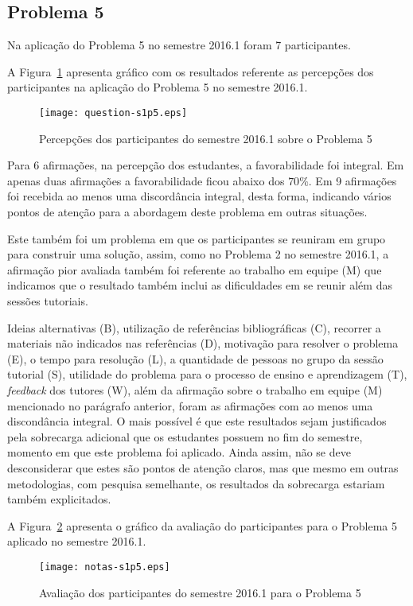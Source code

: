 \subsection{Problema 5}
Na aplicação do Problema 5 no semestre 2016.1 foram 7 participantes.

A Figura~\ref{percep-s1p5} apresenta gráfico com os resultados referente
as percepções dos participantes na aplicação do
Problema 5 no semestre 2016.1.
\begin{figure}[!htb]
\centering
\texttt{[image: question-s1p5.eps]}
\caption{Percepções dos participantes do semestre 2016.1 sobre o Problema 5}
\label{percep-s1p5}
\end{figure}

Para 6 afirmações, na percepção dos estudantes, a favorabilidade foi integral.
Em apenas duas afirmações a favorabilidade ficou abaixo dos $70\%$.
Em 9 afirmações foi recebida ao menos uma discordância integral, desta forma,
indicando vários pontos de atenção para a abordagem deste problema
em outras situações.

Este também foi um problema em que os participantes se reuniram em grupo para
construir uma solução, assim, como no Problema 2 no semestre 2016.1, a
afirmação pior avaliada também foi referente ao trabalho em equipe (M) que
indicamos que o resultado também inclui as dificuldades em se reunir além
das sessões tutoriais.

Ideias alternativas (B), utilização de referências bibliográficas (C),
recorrer a materiais não indicados nas referências (D), motivação
para resolver o problema (E), o tempo para resolução (L), a quantidade de
pessoas no grupo da sessão tutorial (S), utilidade do problema para o
processo de ensino e aprendizagem (T), \textit{feedback} dos
tutores (W), além da afirmação sobre o trabalho em equipe (M)
mencionado no parágrafo anterior, foram as afirmações com ao menos
uma discondância integral.
O mais possível é que este resultados sejam justificados pela sobrecarga
adicional que os estudantes possuem no fim do semestre, momento em que
este problema foi aplicado.
Ainda assim, não se deve desconsiderar que estes são pontos
de atenção claros, mas que mesmo em outras metodologias, com pesquisa
semelhante, os resultados da sobrecarga estariam também explicitados.

A Figura~\ref{aval-s1p5} apresenta o gráfico da
avaliação do participantes para o Problema 5 aplicado no semestre 2016.1.

\begin{figure}[!htb]
\centering
\texttt{[image: notas-s1p5.eps]}
\caption{Avaliação dos participantes do semestre 2016.1 para o Problema 5}
\label{aval-s1p5}
\end{figure}

